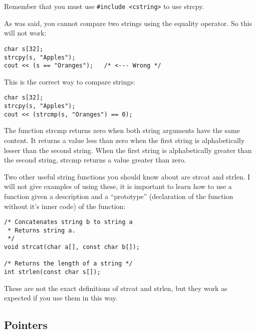 \documentclass[a4paper,12pt]{article}
\begin{document}
Remember that you must use \texttt{\#include <cstring>} to use strcpy.

As was said, you cannot compare two strings using the equality operator. So this will not work:

\begin{lstlisting}
char s[32];
strcpy(s, "Apples");
cout << (s == "Oranges");	/* <--- Wrong */
\end{lstlisting}

This is the correct way to compare strings:

\begin{lstlisting}
char s[32];
strcpy(s, "Apples");
cout << (strcmp(s, "Oranges") == 0);
\end{lstlisting}

The function strcmp returns zero when both string arguments have the same content. It returns a value less than zero when the first string is alphabetically lesser than the second string. When the first string is alphabetically greater than the second string, strcmp returns a value greater than zero.

Two other useful string functions you should know about are strcat and strlen. I will not give examples of using these, it is important to learn how to use a function given a description and a ``prototype'' (declaration of the function without it's inner code) of the function:

\begin{lstlisting}
/* Concatenates string b to string a
 * Returns string a.
 */
void strcat(char a[], const char b[]);

/* Returns the length of a string */
int strlen(const char s[]);
\end{lstlisting}

These are not the exact definitions of strcat and strlen, but they work as expected if you use them in this way.

\subsection*{Pointers}
\end{document}
